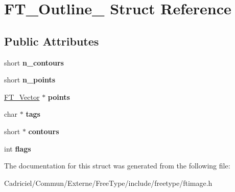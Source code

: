 \hypertarget{struct_f_t___outline__}{}\section{F\+T\+\_\+\+Outline\+\_\+ Struct Reference}
\label{struct_f_t___outline__}
\subsection*{Public Attributes}
\begin{DoxyCompactItemize}
\item 
short {\bfseries n\+\_\+contours}\hypertarget{struct_f_t___outline___a0313ba9c2c51f10e6b7d7ef97bd946e2}{}\label{struct_f_t___outline___a0313ba9c2c51f10e6b7d7ef97bd946e2}

\item 
short {\bfseries n\+\_\+points}\hypertarget{struct_f_t___outline___a7ebcf3c33231af88655534d1ac02b66e}{}\label{struct_f_t___outline___a7ebcf3c33231af88655534d1ac02b66e}

\item 
\hyperlink{struct_f_t___vector__}{F\+T\+\_\+\+Vector} $\ast$ {\bfseries points}\hypertarget{struct_f_t___outline___a4871896a2f38bdab947e30a7cf6bca04}{}\label{struct_f_t___outline___a4871896a2f38bdab947e30a7cf6bca04}

\item 
char $\ast$ {\bfseries tags}\hypertarget{struct_f_t___outline___ac84ca66907361e1f49ec11c14720087a}{}\label{struct_f_t___outline___ac84ca66907361e1f49ec11c14720087a}

\item 
short $\ast$ {\bfseries contours}\hypertarget{struct_f_t___outline___a218fdea14003061142ac1045ac50affa}{}\label{struct_f_t___outline___a218fdea14003061142ac1045ac50affa}

\item 
int {\bfseries flags}\hypertarget{struct_f_t___outline___a149765f0be0eab4fc82410cf853964bf}{}\label{struct_f_t___outline___a149765f0be0eab4fc82410cf853964bf}

\end{DoxyCompactItemize}


The documentation for this struct was generated from the following file\+:\begin{DoxyCompactItemize}
\item 
Cadriciel/\+Commun/\+Externe/\+Free\+Type/include/freetype/ftimage.\+h\end{DoxyCompactItemize}

